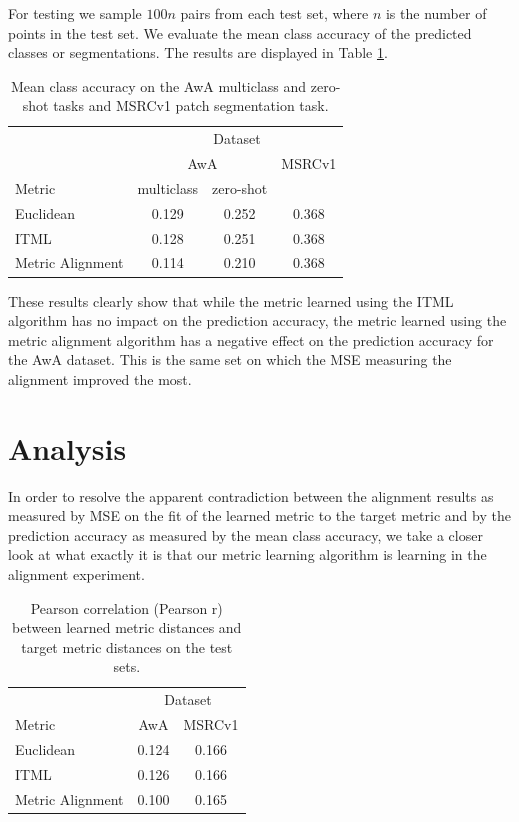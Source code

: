 For testing we sample $100n$ pairs from each test set, where $n$ is the number of points in the test set. We evaluate the mean class accuracy of the predicted classes or segmentations. The results are displayed in Table \ref{tab:accuracy}.

\begin{table}
\begin{center}
\caption{Mean class accuracy on the AwA multiclass and zero-shot tasks and MSRCv1 patch segmentation task.}
\label{tab:accuracy}
\begin{tabular}{lccc}
\toprule
& \multicolumn{3}{c}{Dataset} \\
& \multicolumn{2}{c}{AwA} & MSRCv1 \\
\cline{2-3}
 Metric & multiclass & zero-shot &  \\
\midrule
Euclidean & 0.129 & 0.252 & 0.368 \\
ITML & 0.128 & 0.251 & 0.368 \\
Metric Alignment & 0.114 & 0.210 & 0.368 \\
\bottomrule
\end{tabular}
\end{center}
\end{table}

These results clearly show that while the metric learned using the ITML algorithm has no impact on the prediction accuracy, the metric learned using the metric alignment algorithm has a negative effect on the prediction accuracy for the AwA dataset. This is the same set on which the MSE measuring the alignment improved the most.


\section{Analysis}

In order to resolve the apparent contradiction between the alignment results as measured by MSE on the fit of the learned metric to the target metric and by the prediction accuracy as measured by the mean class accuracy, we take a closer look at what exactly it is that our metric learning algorithm is learning in the alignment experiment.

\begin{table}
\begin{center}
\caption{Pearson correlation (Pearson r) between learned metric distances and target metric distances on the test sets.}
\label{tab:pearson}
\begin{tabular}{lcc}
\toprule
& \multicolumn{2}{c}{Dataset} \\
 Metric & AwA & MSRCv1 \\
\midrule
Euclidean & 0.124 & 0.166 \\
ITML & 0.126 & 0.166 \\
Metric Alignment & 0.100 & 0.165 \\
\bottomrule
\end{tabular}
\end{center}
\end{table}

